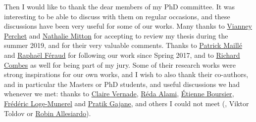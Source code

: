 \begin{acknowledgements}
Then I would like to thank the dear members of my PhD committee.
It was interesting to be able to discuss with them on regular occasions, and these discussions have been very useful for some of our works.
Many thanks to \href{https://sites.google.com/site/vianneyperchet/}{Vianney Perchet} and \href{http://researchers.lille.inria.fr/~mitton/}{Nathalie Mitton} for accepting to review my thesis during the summer 2019, and for their very valuable comments.
Thanks to \href{http://perso.telecom-bretagne.eu/patrickmaille/}{Patrick Maillé} and \href{https://www.researchgate.net/profile/Raphael_Feraud/}{Raphaël Féraud} for following our work since Spring 2017,
and to \href{http://rcombes.supelec.free.fr/}{Richard Combes} as well for being part of my jury.
Some of their research works were strong inspirations for our own works, and I wish to also thank their co-authors, and in particular the Masters or PhD students, and useful discussions we had whenever we met: thanks to \href{https://www.cvernade.com/}{Claire Vernade}, \href{https://www.linkedin.com/in/reda-alami-067304109}{Réda Alami}, \href{https://www.researchgate.net/profile/Etienne_Boursier}{Étienne Boursier}, \href{https://www.researchgate.net/profile/Frederic_Loge_Munerel}{Frédéric Loge-Munerel} and \href{https://pratikgajane.wordpress.com/}{Pratik Gajane}, and others I could not meet (\eg, Viktor Toldov or \href{https://fr.linkedin.com/in/robin-allesiardo-phd-39221a92}{Robin Allesiardo}).


\end{acknowledgements}
